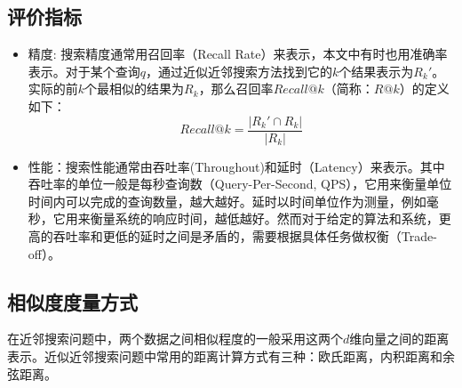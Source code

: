 \subsection{评价指标}
\begin{itemize}
    \item 精度: 搜索精度通常用召回率（Recall Rate）来表示，本文中有时也用准确率表示。对于某个查询$q$，通过近似近邻搜索方法找到它的$k$个结果表示为$R_{k}'$。实际的前$k$个最相似的结果为$R_k$，那么召回率$Recall@k$（简称：$R@k$）的定义如下：
    \begin{equation}
    Recall@k = \frac{{\left| {R_{k}' \cap R_{k}} \right|}}{{\left| {R_{k}} \right|}} \label{eq:recall}
    \end{equation}
    
    \item 性能：搜索性能通常由吞吐率(Throughout)和延时（Latency）来表示。其中吞吐率的单位一般是每秒查询数（Query-Per-Second, QPS），它用来衡量单位时间内可以完成的查询数量，越大越好。延时以时间单位作为测量，例如毫秒，它用来衡量系统的响应时间，越低越好。然而对于给定的算法和系统，更高的吞吐率和更低的延时之间是矛盾的，需要根据具体任务做权衡（Trade-off）。
\end{itemize}

\subsection{相似度度量方式}
在近邻搜索问题中，两个数据之间相似程度的一般采用这两个$d$维向量之间的距离表示。近似近邻搜索问题中常用的距离计算方式有三种：欧氏距离\cite{dokmanic2015euclidean}，内积距离\cite{critchley1988certain}和余弦距离\cite{zou2008shape, nguyen2010cosine}。

